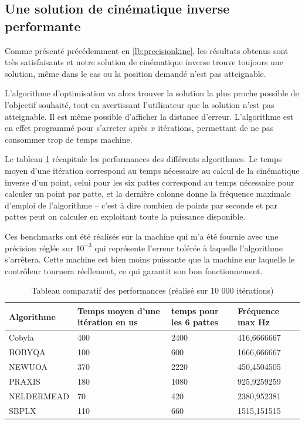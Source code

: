 \documentclass{tnreport}
\begin{document}
\subsection{Une solution de cinématique inverse performante}
Comme présenté précédemment en \ref{lb:precisionkine}, les résultats obtenus sont très satisfaisants et notre solution de cinématique inverse trouve toujours une solution, même dans le cas ou la position demandé n'est pas atteignable. 

L'algorithme d'optimisation va alors trouver la solution la plus proche possible de l'objectif souhaité, tout en avertissant l'utilisateur que la solution n'est pas atteignable. Il est même possible d'afficher la distance d'erreur. L'algorithme est en effet programmé pour s'arreter après $x$ itérations, permettant de ne pas consommer trop de temps machine.

Le tableau \ref{tab:perf} récapitule les performances des différents algorithmes. Le temps moyen d'une itération correspond au temps nécessaire au calcul de la cinématique inverse d'un point, celui pour les six pattes correspond au temps nécessaire pour calculer un point par patte, et la dernière colonne donne la fréquence maximale d'emploi de l'algorithme -- c'est à dire combien de points par seconde et par pattes peut on calculer en exploitant toute la puissance disponible. 

Ces benchmarks ont été réalisés sur la machine qui m'a été fournie avec une précision réglée sur $10^{-3}$ qui représente l'erreur tolérée à laquelle l'algorithme s'arrêtera. Cette machine est bien moins puissante que la machine sur laquelle le contrôleur tournera réellement, ce qui garantit son bon fonctionnement.

\begin{table}[]
\centering
\begin{tabular}{|l|l|l|l|}
\hline
Algorithme       & Temps moyen d'une itération en us  & temps pour les 6 pattes & Fréquence max Hz \\ \hline
Cobyla     & 400                                                               & 2400                    & 416,6666667      \\ \hline
BOBYQA     & 100                                                               & 600                     & 1666,666667      \\ \hline
NEWUOA     & 370                                                               & 2220                    & 450,4504505      \\ \hline
PRAXIS     & 180                                                               & 1080                    & 925,9259259      \\ \hline
NELDERMEAD & 70                                                                & 420                     & 2380,952381      \\ \hline
SBPLX      & 110                                                               & 660                     & 1515,151515      \\ \hline
\end{tabular}
\caption{Tableau comparatif des performances (réalisé sur 10 000 itérations)}
\label{tab:perf}
\end{table}
\end{document}
